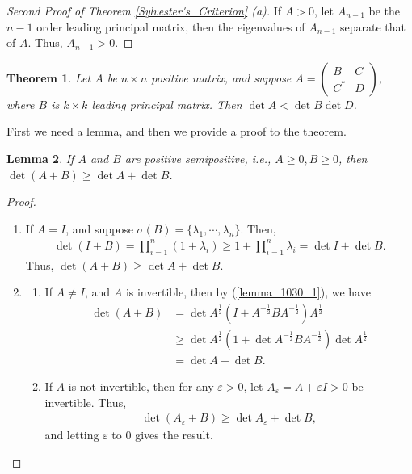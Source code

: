 \documentclass[11pt]{book}
\newtheorem{theorem}{Theorem}[chapter]
\newtheorem{lemma}[theorem]{Lemma}
\theoremstyle{definition}
\numberwithin{equation}{chapter}
\begin{document}
\begin{proof}[Second Proof of Theorem \ref{Sylvester's_Criterion} (a)]
If $A > 0$, let $A_{n-1}$ be the $n-1$ order leading principal matrix, then the eigenvalues of $A_{n-1}$ separate that of $A$. Thus, $A_{n-1} > 0$.
\end{proof}

\medskip

\begin{theorem}\label{block_matrix_inequality}
Let $A$ be $n \times n$ positive matrix, and suppose $A = \begin{pmatrix} B & C \\ C^* & D \end{pmatrix}$, where $B$ is $k \times k$ leading principal matrix. Then $\det A < \det B \det D$.
\end{theorem}

First we need a lemma, and then we provide a proof to the theorem.

\begin{lemma}
If $A$ and $B$ are positive semipositive, i.e., $A \geq 0, B \geq 0$, then $\det(A + B) \geq \det A + \det B$.
\end{lemma}
\begin{proof}
~\begin{enumerate}[label=(\alph*)]
    \item If $A = I$, and suppose $\sigma(B) = \{\lambda_1, \cdots, \lambda_n\}$. Then,
    \begin{align}\label{lemma_1030_1}
        \det(I + B) = \prod^n_{i=1} (1 + \lambda_i) \geq 1 + \prod^n_{i=1} \lambda_i = \det I + \det B.
    \end{align}
    Thus, $\det(A + B) \geq \det A + \det B$.
    
    \item 
    \begin{enumerate}[label=\arabic*)]
        \item If $A \neq I$, and $A$ is invertible, then by (\ref{lemma_1030_1}), we have
        \begin{align*}
            \det (A + B) & = \det A^{\frac{1}{2}}\left(I + A^{-\frac{1}{2}}BA^{-\frac{1}{2}}\right) A^{\frac{1}{2}} \\
            & \geq \det A^{\frac{1}{2}} \left(1 + \det A^{-\frac{1}{2}} B A^{-\frac{1}{2}} \right) \det A^{\frac{1}{2}} \\
            & = \det A + \det B.
        \end{align*}
        
        \item If $A$ is not invertible, then for any $\varepsilon > 0$, let $A_\varepsilon = A + \varepsilon I > 0$ be invertible. Thus, 
        \begin{align*}
            \det (A_\varepsilon + B) \geq \det A_\varepsilon + \det B,
        \end{align*}
        and letting $\varepsilon$ to $0$ gives the result.
    \end{enumerate}
\end{enumerate}
\end{proof}
\end{document}
